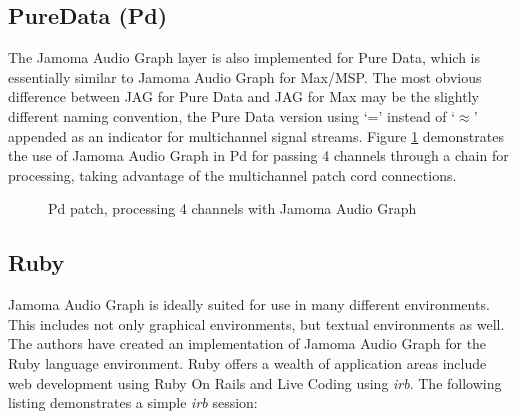 \documentclass[twoside,a4paper]{article}
\begin{document}


\subsection{PureData (Pd)} %

The Jamoma Audio Graph layer is also implemented for Pure Data, which is essentially similar to Jamoma Audio Graph for Max/MSP. 
The most obvious difference between JAG for Pure Data and JAG for Max may be the slightly different naming convention, the Pure Data version using `=' instead of `$\approx$' appended as an indicator for multichannel signal streams. 
Figure \ref{fig:pd} demonstrates the use of Jamoma Audio Graph in Pd for passing 4 channels through a chain for processing, taking advantage of the multichannel patch cord connections.  

\begin{figure}[htbp]
\centerline{}
\caption{Pd patch, processing 4 channels with Jamoma Audio Graph}
\label{fig:pd}
\end{figure}



\subsection{Ruby} %

Jamoma Audio Graph is ideally suited for use in many different environments. 
This includes not only graphical environments, but textual environments as well.  
The authors have created an implementation of Jamoma Audio Graph for the Ruby language environment.  
Ruby offers a wealth of application areas include web development using Ruby On Rails \cite{Ruby:2009} and Live Coding \cite{Collins:2003} using \emph{irb}.  
The following listing demonstrates a simple \emph{irb} session:
\end{document}
